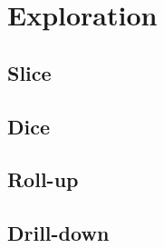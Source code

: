 \chapter{Exploration}

\section{Slice}


\section{Dice}


\section{Roll-up}


\section{Drill-down}

